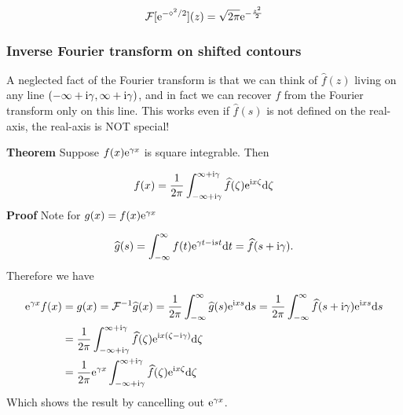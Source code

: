 \documentclass[12pt,landscape]{article}
\def\D{ {\rm d} }
\def\I{ {\rm i} }
\def\E{ {\rm e} }
\def\FF{ {\cal F} }
\def\dt{\D t}
\begin{document}
{\[
\FF[\E^{-\diamond^2/2}](z) = \sqrt{2\pi} \E^{-{z^2 \over 2}}
\]
\subsubsection{Inverse Fourier transform on shifted contours}
A neglected fact of the Fourier transform is that we can think of $\hat f(z)$ living on any line $(-\infty + \I \gamma, \infty+\I \gamma)$, and in fact we can recover $f$ from the Fourier transform only on this line. This works even if $\hat f(s)$ is not defined on the real-axis, the real-axis is NOT special!

\textbf{Theorem} Suppose $f(x) \E^{\gamma x}$ is square integrable. Then

\[
f(x) = {1 \over 2 \pi} \int_{-\infty+\I \gamma}^{\infty + \I \gamma} \widehat f(\zeta) \E^{\I x \zeta} \D \zeta
\]
\textbf{Proof}  Note for $g(x) = f(x) \E^{\gamma x}$

\[
\widehat g(s) = \int_{-\infty}^\infty f(t) \E^{\gamma t - \I s t} \dt = \widehat f(s + \I \gamma).
\]
Therefore we have


\begin{align*}
\E^{\gamma x} f(x) &= g(x) = \FF^{-1} \widehat g(x) = {1 \over 2 \pi} \int_{-\infty}^{\infty} \widehat g(s) \E^{\I x s} \D s  ={1 \over 2 \pi} \int_{-\infty}^{\infty} \widehat f(s + \I \gamma) \E^{\I x s} \D s \\
   & = {1 \over 2 \pi} \int_{-\infty+ \I \gamma}^{\infty+ \I \gamma} \widehat f(\zeta) \E^{\I x (\zeta - \I \gamma)} \D \zeta \\
    &= {1 \over 2 \pi}
   \E^{\gamma x}  \int_{-\infty+ \I \gamma}^{\infty+ \I \gamma} \widehat f(\zeta) \E^{\I x \zeta} \D \zeta
\end{align*}
Which shows the result by cancelling out $\E^{\gamma x}$.

}
\end{document}
